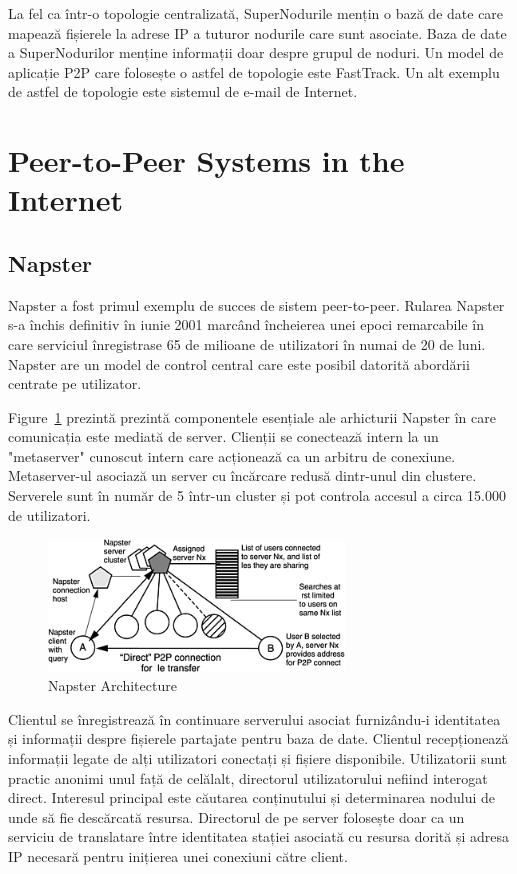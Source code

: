 La fel ca într-o topologie centralizată, SuperNodurile mențin o bază de date
care mapează fișierele la adrese IP a tuturor nodurile care sunt asociate.
Baza de date a SuperNodurilor menține informații doar despre grupul de noduri.
Un model de aplicație P2P care folosește o astfel de topologie este FastTrack.
Un alt exemplu de astfel de topologie este sistemul de e-mail de Internet.

\section{Peer-to-Peer Systems in the Internet}
\label{sec:p2p-systems:p2p-internet}

\subsection{Napster}

Napster a fost primul exemplu de succes de sistem peer-to-peer. Rularea
Napster s-a închis definitiv în iunie 2001 marcând încheierea unei epoci
remarcabile în care serviciul înregistrase 65 de milioane de utilizatori în
numai de 20 de luni. Napster are un model de control central care este posibil
datorită abordării centrate pe utilizator.

Figure~\ref{fig:p2p-systems:napster} prezintă prezintă componentele esențiale
ale arhicturii Napster în care comunicația este mediată de server. Clienții se
conectează intern la un "metaserver" cunoscut intern care acționează ca un
arbitru de conexiune. Metaserver-ul asociază un server cu încărcare redusă
dintr-unul din clustere. Serverele sunt în număr de 5 într-un cluster și pot
controla accesul a circa 15.000 de utilizatori.

\begin{figure}
  \centering
  \includegraphics[width=0.7\textwidth]{src/img/p2p-systems/napster}
  \caption{Napster Architecture}
  \label{fig:p2p-systems:napster}
\end{figure}

Clientul se înregistrează în continuare serverului asociat furnizându-i
identitatea și informații despre fișierele partajate pentru baza de date.
Clientul recepționează informații legate de alți utilizatori conectați și
fișiere disponibile. Utilizatorii sunt practic anonimi unul față de celălalt,
directorul utilizatorului nefiind interogat direct. Interesul principal este
căutarea conținutului și determinarea nodului de unde să fie descărcată
resursa. Directorul de pe server folosește doar ca un serviciu de translatare
între identitatea stației asociată cu resursa dorită și adresa IP necesară
pentru inițierea unei conexiuni către client.

